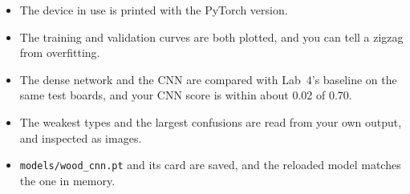 \begin{labchecklists}
\begin{verification}
\begin{itemize}
  \item The device in use is printed with the PyTorch version.
  \item The training and validation curves are both plotted, and you can tell a zigzag from overfitting.
  \item The dense network and the CNN are compared with Lab~4's baseline on the same test boards, and your CNN score is within about 0.02 of 0.70.
  \item The weakest types and the largest confusions are read from your own output, and inspected as images.
  \item \texttt{models/wood\_cnn.pt} and its card are saved, and the reloaded model matches the one in memory.
\end{itemize}
\end{verification}
\end{labchecklists}
